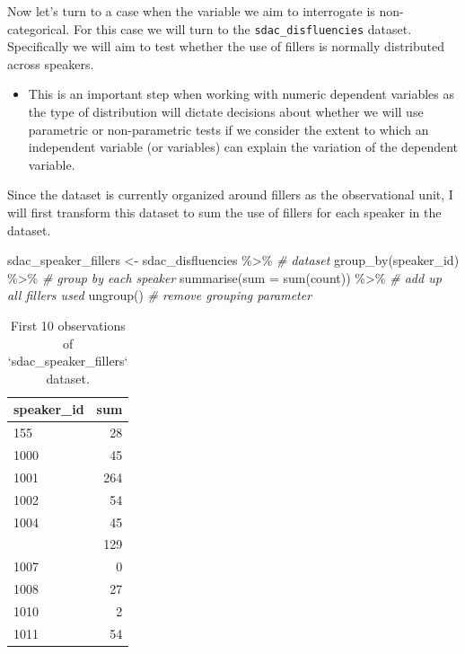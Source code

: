 \documentclass[
]{article}
\newenvironment{Shaded}{\begin{snugshade}}{\end{snugshade}}
\newcommand{\AttributeTok}[1]{\textcolor[rgb]{0.77,0.63,0.00}{#1}}
\newcommand{\CommentTok}[1]{\textcolor[rgb]{0.56,0.35,0.01}{\textit{#1}}}
\newcommand{\FunctionTok}[1]{\textcolor[rgb]{0.00,0.00,0.00}{#1}}
\newcommand{\NormalTok}[1]{#1}
\newcommand{\OtherTok}[1]{\textcolor[rgb]{0.56,0.35,0.01}{#1}}
\newcommand{\SpecialCharTok}[1]{\textcolor[rgb]{0.00,0.00,0.00}{#1}}
\newenvironment{rmdblock}[1]
  {\begin{shaded*}
  \begin{itemize}
  \renewcommand{\labelitemi}{
    \raisebox{-.5\height}[0pt][0pt]{
      {\setkeys{Gin}{width=2em,keepaspectratio}\texttt{[image: assets/images/\#1]}}
    }
  }
  \item
  }
  {
  \end{itemize}
  \end{shaded*}
  }
\newenvironment{rmdtip}
  {\begin{rmdblock}{tip}}
  {\end{rmdblock}}
\begin{document}
Now let's turn to a case when the variable we aim to interrogate is non-categorical. For this case we will turn to the \texttt{sdac\_disfluencies} dataset. Specifically we will aim to test whether the use of fillers is normally distributed across speakers.

\begin{rmdtip}
This is an important step when working with numeric dependent variables
as the type of distribution will dictate decisions about whether we will
use parametric or non-parametric tests if we consider the extent to
which an independent variable (or variables) can explain the variation
of the dependent variable.
\end{rmdtip}

Since the dataset is currently organized around fillers as the observational unit, I will first transform this dataset to sum the use of fillers for each speaker in the dataset.

\begin{Shaded}
\begin{Highlighting}[]
\NormalTok{sdac\_speaker\_fillers }\OtherTok{\textless{}{-}} 
\NormalTok{  sdac\_disfluencies }\SpecialCharTok{\%\textgreater{}\%} \CommentTok{\# dataset}
  \FunctionTok{group\_by}\NormalTok{(speaker\_id) }\SpecialCharTok{\%\textgreater{}\%} \CommentTok{\# group by each speaker}
  \FunctionTok{summarise}\NormalTok{(}\AttributeTok{sum =} \FunctionTok{sum}\NormalTok{(count)) }\SpecialCharTok{\%\textgreater{}\%} \CommentTok{\# add up all fillers used}
  \FunctionTok{ungroup}\NormalTok{() }\CommentTok{\# remove grouping parameter}
\end{Highlighting}
\end{Shaded}

\begin{table}

\caption{\label{tab:i-uni-cont-sdac-transform-preview}First 10 observations of `sdac_speaker_fillers` dataset.}
\centering
\begin{tabular}[t]{lr}
\toprule
speaker\_id & sum\\
\midrule
155 & 28\\
1000 & 45\\
1001 & 264\\
1002 & 54\\
1004 & 45\\
\addlinespace
1005 & 129\\
1007 & 0\\
1008 & 27\\
1010 & 2\\
1011 & 54\\
\bottomrule
\end{tabular}
\end{table}
\end{document}
